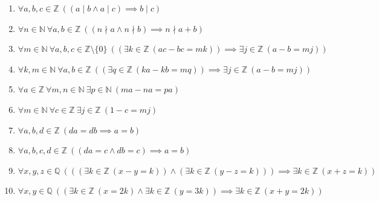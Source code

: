 \documentclass[11pt,a4paper]{article}
\begin{document}
\begin{enumerate}
\item $\displaystyle \forall a, b, c \in \mathbb{Z}\ ((a \mid b \land a \mid c) \implies b \mid c)$
\item $\displaystyle \forall n \in \mathbb{N}\ \forall a, b \in \mathbb{Z}\ ((n \nmid a \land n \nmid b) \implies n \nmid a + b)$
\item $\displaystyle \forall m \in \mathbb{N}\ \forall a, b, c \in \mathbb{Z} \setminus \{0\}\ ((\exists k \in \mathbb{Z}\ (ac - bc = mk)) \implies \exists j \in \mathbb{Z}\ (a - b = mj))$
\item $\displaystyle \forall k, m \in \mathbb{N}\ \forall a, b \in \mathbb{Z}\ ((\exists q \in \mathbb{Z}\ (ka - kb = mq)) \implies \exists j \in \mathbb{Z}\ (a - b = mj))$
\item $\displaystyle \forall a \in \mathbb{Z}\ \forall m, n \in \mathbb{N}\ \exists p \in \mathbb{N}\ (ma - na = pa)$
\item $\displaystyle \forall m \in \mathbb{N}\ \forall c \in \mathbb{Z}\ \exists j \in \mathbb{Z}\ (1 - c = mj)$
\item $\displaystyle \forall a, b, d \in \mathbb{Z}\ (da = db \implies a = b)$
\item $\displaystyle \forall a, b, c, d \in \mathbb{Z}\ ((da = c \land db = c) \implies a = b)$
\item $\displaystyle \forall x, y, z \in \mathbb{Q}\ (((\exists k \in \mathbb{Z}\ (x - y = k)) \land (\exists k \in \mathbb{Z}\ (y - z = k))) \implies \exists k \in \mathbb{Z}\ (x + z = k))$
\item $\displaystyle \forall x, y \in \mathbb{Q}\ ((\exists k \in \mathbb{Z}\ (x = 2k) \land \exists k \in \mathbb{Z}\ (y = 3k)) \implies \exists k \in \mathbb{Z}\ (x + y = 2k))$
\end{enumerate}
\end{document}
